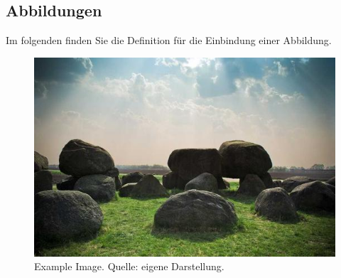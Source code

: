 \subsection{Abbildungen}

Im folgenden finden Sie die Definition für die Einbindung einer Abbildung.

\begin{figure}[h!]
  \centering
  \includegraphics[scale=0.2]{Images/example}
  \caption[Example Image.]{Example Image. Quelle: eigene Darstellung.}
  \label{fig:example_image}
\end{figure}
